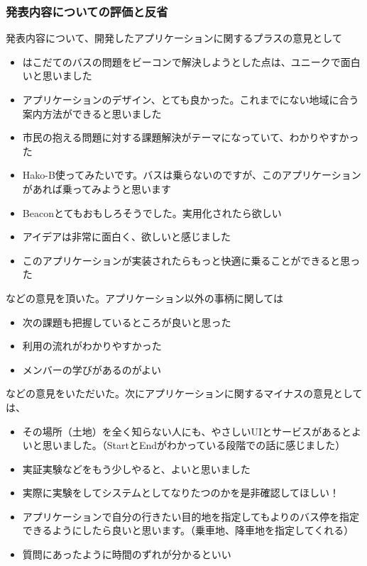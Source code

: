 \documentclass[openany,11pt,papersize]{jsbook}
\begin{document}

\subsubsection{発表内容についての評価と反省}
発表内容について、開発したアプリケーションに関するプラスの意見として
\begin{itemize}

\item はこだてのバスの問題をビーコンで解決しようとした点は、ユニークで面白いと思いました
\item アプリケーションのデザイン、とても良かった。これまでにない地域に合う案内方法ができると思いました
\item 市民の抱える問題に対する課題解決がテーマになっていて、わかりやすかった
\item Hako-B使ってみたいです。バスは乗らないのですが、このアプリケーションがあれば乗ってみようと思います
\item Beaconとてもおもしろそうでした。実用化されたら欲しい
\item アイデアは非常に面白く、欲しいと感じました
\item このアプリケーションが実装されたらもっと快適に乗ることができると思った

\end{itemize}
などの意見を頂いた。アプリケーション以外の事柄に関しては
\begin{itemize}

\item 次の課題も把握しているところが良いと思った
\item 利用の流れがわかりやすかった
\item メンバーの学びがあるのがよい

\end{itemize}
などの意見をいただいた。次にアプリケーションに関するマイナスの意見としては、
\begin{itemize}

\item その場所（土地）を全く知らない人にも、やさしいUIとサービスがあるとよいと思いました。（StartとEndがわかっている段階での話に感じました）
\item 実証実験などをもう少しやると、よいと思いました
\item 実際に実験をしてシステムとしてなりたつのかを是非確認してほしい！
\item アプリケーションで自分の行きたい目的地を指定してもよりのバス停を指定できるようにしたら良いと思います。（乗車地、降車地を指定してくれる）
\item 質問にあったように時間のずれが分かるといい

\end{itemize}
\end{document}
